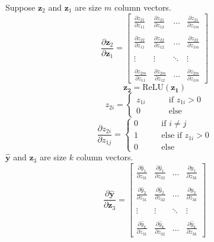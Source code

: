 \documentclass[a4paper]{article}
\begin{document}
\pagebreak
\subsubsection{} %
Suppose $\bm{z}_2$ and $\bm{z}_1$ are size $m$ column vectors.
$$\frac{\partial{\bm{z}_2}}{\partial{\bm{z}_1}}=
\begin{bmatrix}
	\frac{\partial{z_{21}}}{\partial{z_{11}}} & \frac{\partial{z_{21}}}{\partial{z_{12}}} & \dots & \frac{\partial{z_{21}}}{\partial{z_{1m}}} \\\\
	\frac{\partial{z_{22}}}{\partial{z_{11}}} & \frac{\partial{z_{22}}}{\partial{z_{12}}} & \dots & \frac{\partial{z_{22}}}{\partial{z_{1m}}} \\\\
	\vdots & \vdots & \ddots & \vdots \\\\
	\frac{\partial{z_{2m}}}{\partial{z_{11}}} & \frac{\partial{z_{2m}}}{\partial{z_{12}}} & \dots & \frac{\partial{z_{2m}}}{\partial{z_{1m}}}
\end{bmatrix}$$
$$\bm{z_2}=\text{ReLU}(\bm{z_1})$$
$$z_{2i}=\begin{cases}
	z_{1i} \qquad & \text{if } z_{1i}>0 \\
	0 \qquad & \text{else}
\end{cases}$$
$$\frac{\partial{z_{2i}}}{\partial{z_{1j}}}=\begin{cases}
	0 \qquad & \text{if } i\neq j \\
	1 \qquad & \text{else if } z_{1i}>0 \\
	0 \qquad & \text{else}
\end{cases}$$
$\bm{\hat{y}}$ and $\bm{z}_3$ are size $k$ column vectors.
$$\frac{\partial{\bm{\hat{y}}}}{\partial{\bm{z}_3}}=
\begin{bmatrix}
	\frac{\partial{\hat{y}_1}}{\partial{z_{31}}} & \frac{\partial{\hat{y}_1}}{\partial{z_{32}}} & \dots & \frac{\partial{\hat{y}_1}}{\partial{z_{3k}}} \\\\
	\frac{\partial{\hat{y}_2}}{\partial{z_{31}}} & \frac{\partial{\hat{y}_2}}{\partial{z_{32}}} & \dots & \frac{\partial{\hat{y}_2}}{\partial{z_{3k}}} \\\\
	\vdots & \vdots & \ddots & \vdots \\\\
	\frac{\partial{\hat{y}_k}}{\partial{z_{31}}} & \frac{\partial{\hat{y}_k}}{\partial{z_{32}}} & \dots & \frac{\partial{\hat{y}_k}}{\partial{z_{3k}}}
\end{bmatrix}$$
\end{document}
